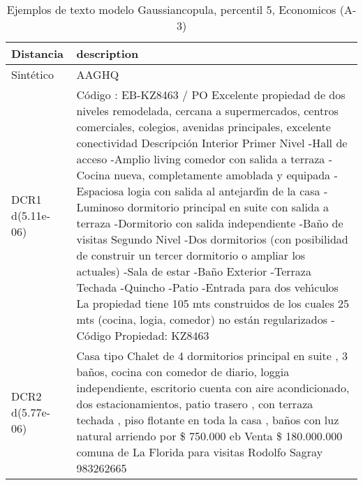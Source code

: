 \begin{table}[H]
\centering
\fontsize{10}{14}\selectfont
\caption{Ejemplos de texto modelo Gaussiancopula, percentil 5, Economicos (A-3)}
\label{table-example-economicos-a-3-gaussiancopula-5p-text}
\begin{tabular}{|l|m{35em}|}
\hline
\rowcolor[gray]{0.8}
Distancia & description \\
\hline Sintético & AAGHQ \\
\hline DCR1 d(5.11e-06) & C\'odigo : EB-KZ8463 / PO  Excelente propiedad de dos niveles remodelada, cercana a supermercados, centros comerciales, colegios, avenidas principales, excelente conectividad  Descripci\'on Interior Primer Nivel -Hall de acceso -Amplio living comedor con salida a terraza -Cocina nueva, completamente amoblada y equipada -Espaciosa logia con salida al antejard{\'\i}n de la casa -Luminoso dormitorio principal en suite con salida a terraza -Dormitorio con salida independiente -Ba\~no de visitas  Segundo Nivel -Dos dormitorios (con posibilidad de construir un tercer dormitorio o ampliar los actuales) -Sala de estar -Ba\~no  Exterior -Terraza Techada -Quincho -Patio -Entrada para dos veh{\'\i}culos  La propiedad tiene 105 mts construidos de los cuales 25 mts (cocina, logia, comedor) no est\'an regularizados - C\'odigo Propiedad: KZ8463 \\
\hline DCR2 d(5.77e-06) & Casa tipo Chalet de 4 dormitorios principal en suite , 3 ba\~nos, cocina con comedor de diario, loggia independiente, escritorio cuenta con aire acondicionado, dos estacionamientos, patio trasero , con terraza techada , piso flotante en toda la casa , ba\~nos con luz natural arriendo por \$ 750.000 eb Venta \$ 180.000.000 comuna de La Florida para visitas Rodolfo Sagray 983262665 \\
\hline
\end{tabular}
\end{table}
